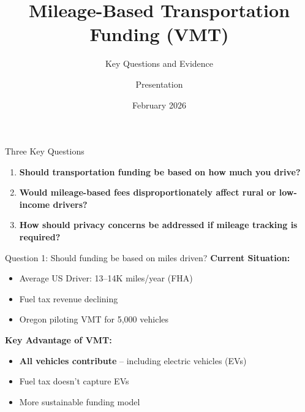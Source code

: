 \documentclass[aspectratio=169]{beamer}
\title{Mileage-Based Transportation Funding (VMT)}
\subtitle{Key Questions and Evidence}
\author{Presentation}
\date{February 2026}
\begin{document}
\frame{\titlepage}

\begin{frame}{Three Key Questions}
\begin{enumerate}
\item \textbf{Should transportation funding be based on how much you drive?}
\vspace{0.5cm}
\item \textbf{Would mileage-based fees disproportionately affect rural or low-income drivers?}
\vspace{0.5cm}
\item \textbf{How should privacy concerns be addressed if mileage tracking is required?}
\end{enumerate}
\end{frame}


\begin{frame}{Question 1: Should funding be based on miles driven?}
\textbf{Current Situation:}
\begin{itemize}
\item Average US Driver: 13--14K miles/year (FHA)
\item Fuel tax revenue declining
\item Oregon piloting VMT for 5,000 vehicles
\end{itemize}

\vspace{0.5cm}
\textbf{Key Advantage of VMT:}
\begin{itemize}
\item \textbf{All vehicles contribute} -- including electric vehicles (EVs)
\item Fuel tax doesn't capture EVs
\item More sustainable funding model
\end{itemize}
\end{frame}
\end{document}
